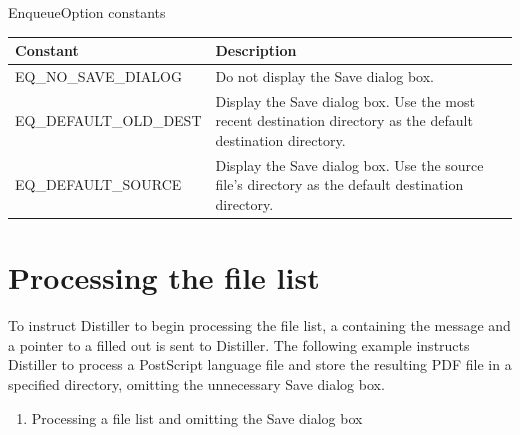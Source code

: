 \documentclass[letterpaper,12pt,english,openany,oneside]{sphinxmanual}
\begin{document}
EnqueueOption constants


\begin{savenotes}\sphinxattablestart
\centering
{}\label{\detokenize{Distiller_WinIntro:section-1}}\nobreak
\begin{tabulary}{\linewidth}[t]{|T|T|}
\hline
\sphinxstyletheadfamily 
Constant
&\sphinxstyletheadfamily 
Description
\\
\hline
EQ\_NO\_SAVE\_DIALOG
&
Do not display the Save dialog box.
\\
\hline
EQ\_DEFAULT\_OLD\_DEST
&
Display the Save dialog box. Use the most recent destination directory as the default destination directory.
\\
\hline
EQ\_DEFAULT\_SOURCE
&
Display the Save dialog box. Use the source file’s directory as the default destination directory.
\\
\hline
\end{tabulary}
\par
\sphinxattableend\end{savenotes}


\section{Processing the file list}
\label{\detokenize{Distiller_WinIntro:processing-the-file-list}}
To instruct Distiller to begin processing the file list, a  containing the  message and a pointer to a filled out  is sent to Distiller. The following example instructs Distiller to process a PostScript language file and store the resulting PDF file in a specified directory, omitting the unnecessary Save dialog box.
\begin{enumerate}
%
\item {} 
Processing a file list and omitting the Save dialog box

\end{enumerate}
\end{document}
